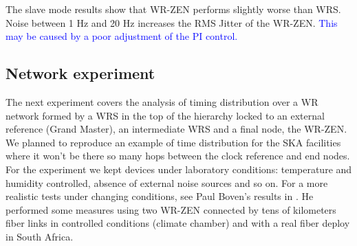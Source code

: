 The slave mode results show that WR-ZEN performs slightly worse than WRS. Noise between 1 Hz and 20 Hz increases the RMS Jitter of the WR-ZEN. \textcolor{blue}{This may be caused by a poor adjustment of the PI control.}


\subsection{Network experiment} %
\label{subsec: net_exp}

The next experiment covers the analysis of timing distribution over a WR network formed by a WRS in the top of the hierarchy locked to an external reference (Grand Master), an intermediate WRS and a final node, the WR-ZEN. We planned to reproduce an example of time distribution for the SKA facilities where it won't be there so many hops between the clock reference and end nodes. For the experiment we kept devices under laboratory conditions: temperature and humidity controlled, absence of external noise sources and so on. For a more realistic tests under changing conditions, see Paul Boven's results in \cite{paultests}. He performed some measures using two WR-ZEN connected by tens of kilometers fiber links in controlled conditions (climate chamber) and with a real fiber deploy in South Africa.

